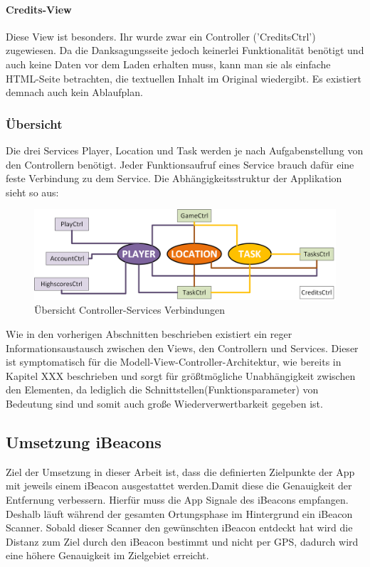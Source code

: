 \paragraph{Credits-View}
%
%
Diese View ist besonders. Ihr wurde zwar ein Controller ('CreditsCtrl') zugewiesen. Da die Danksagungsseite jedoch keinerlei Funktionalität benötigt und auch keine Daten vor dem Laden erhalten muss, kann man sie als einfache HTML-Seite betrachten, die textuellen Inhalt im Original wiedergibt. Es existiert demnach auch kein Ablaufplan.
\subsubsection{Übersicht}
Die drei Services Player, Location und Task werden je nach Aufgabenstellung von den Controllern benötigt. Jeder Funktionsaufruf eines Service brauch dafür eine feste Verbindung zu dem Service. Die Abhängigkeitsstruktur der Applikation sieht so aus:
\begin{figure}[h]
\centering
\includegraphics[width=1\textwidth]{ref/images/controller_services.png}
\caption[Übersicht Controller-Services Verbindungen]{Übersicht Controller-Services Verbindungen}
\label{fig:Controller-Services}
\end{figure} 

Wie in den vorherigen Abschnitten beschrieben existiert ein reger Informationsaustausch zwischen den Views, den Controllern und Services. Dieser ist symptomatisch für die Modell-View-Controller-Architektur, wie bereits in Kapitel XXX beschrieben und sorgt für größtmögliche Unabhängigkeit zwischen den Elementen, da lediglich die Schnittstellen(Funktionsparameter) von Bedeutung sind und somit auch große Wiederverwertbarkeit gegeben ist.
\subsection{Umsetzung iBeacons}
Ziel der Umsetzung in dieser Arbeit ist, dass die definierten Zielpunkte der App mit jeweils einem iBeacon ausgestattet werden.Damit diese die Genauigkeit der Entfernung verbessern.
Hierfür muss die App Signale des iBeacons empfangen. Deshalb läuft während der gesamten Ortungsphase im Hintergrund ein iBeacon Scanner. Sobald dieser Scanner den gewünschten iBeacon entdeckt hat wird die Distanz zum Ziel durch den iBeacon bestimmt und nicht per GPS, dadurch wird eine höhere Genauigkeit im Zielgebiet erreicht.

